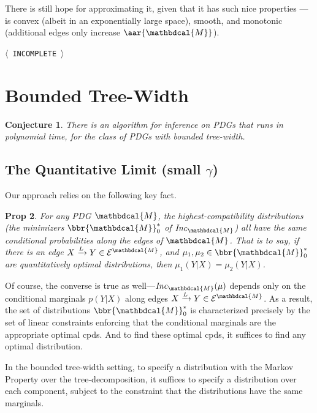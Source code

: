 \documentclass{article}
\theoremstyle{plain}
\newtheorem{theorem}{Theorem}[section]
\newtheorem{prop}[theorem]{Prop}
\newtheorem{conj}[theorem]{Conjecture}
\theoremstyle{definition}
\theoremstyle{remark}
\newcommand{\TODO}[1][INCOMPLETE]{{\centering\Large\color{red}$\langle$~\texttt{#1}~$\rangle$\par}}
\newcommand{\Ed}{\mathcal E}
\newcommand{\dg}[1]{\mathbdcal{#1}}
\newcommand\Inc{\mathit{Inc}}
\newcommand{\ed}[3]{%
		\mathchoice%
		{#2\overset{\smash{\mskip-5mu\raisebox{-3pt}{${#1}$}}}{\xrightarrow{\hphantom{\scriptstyle {#1}}}} #3} %
		{#2\overset{\smash{\mskip-5mu\raisebox{-3pt}{$\scriptstyle {#1}$}}}{\xrightarrow{\hphantom{\scriptstyle {#1}}}} #3}%
		{#2\overset{\smash{\mskip-5mu\raisebox{-3pt}{$\scriptscriptstyle {#1}$}}}{\xrightarrow{\hphantom{\scriptscriptstyle {#1}}}} #3} %
		{#2\overset{\smash{\mskip-5mu\raisebox{-3pt}{$\scriptscriptstyle {#1}$}}}{\xrightarrow{\hphantom{\scriptscriptstyle {#1}}}} #3}} %
\begin{document}
There is still hope for approximating it, given that it has such nice properties --- is convex (albeit in an exponentially large space), smooth, and monotonic (additional edges only increase $\aar{\dg M}$).

\TODO


\section{Bounded Tree-Width}

\begin{conj}
	There is an algorithm for inference on PDGs that runs in polynomial time, for the class of PDGs with bounded tree-width. 
\end{conj}



\subsection{The Quantitative Limit (small \texorpdfstring{$\gamma$}{\textbackslash gamma})}

Our approach relies on the following key fact. 

\begin{prop}
	For any PDG $\dg M$, 
	the highest-compatibility distributions (the minimizers $\bbr{\dg M}_0^*$ of $\Inc_{\dg M}$) all have the same conditional probabilities along the edges of $\dg M$.   
	That is to say, if there is an edge $\ed LXY \in \Ed^{\dg M}$, and $\mu_1, \mu_2 \in \bbr{\dg M}_0^*$ are quantitatively optimal distributions, then $\mu_1(Y|X) = \mu_2(Y|X)$.  
\end{prop}


Of course, the converse is true as well---$\Inc_{\dg M}(\mu)$ depends only on the conditional marginals $p(Y|X)$ along edges $\ed LXY \in \Ed^{\dg M}$. 
As a result, the set of distributions $\bbr{\dg M}_0^*$ is characterized precisely by the set of linear constraints enforcing that the conditional marginals are the appropriate optimal cpds.
And to find these optimal cpds, it suffices to find any optimal distribution.


In the bounded tree-width setting, to specify a distribution with the Markov Property over the tree-decomposition, it suffices to specify a distribution over each component, subject to the constraint that the distributions have the same marginals. 
\end{document}
